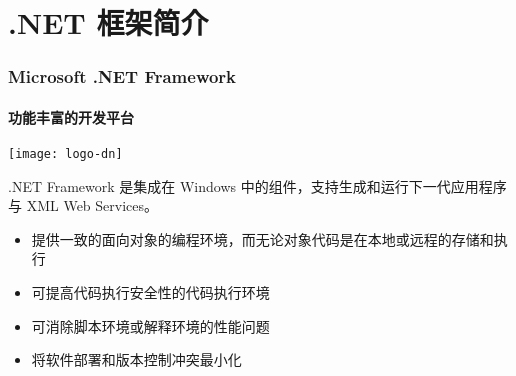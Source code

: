 \section{.NET 框架简介}

\begin{frame}
\frametitle{Microsoft .NET Framework}
\framesubtitle{功能丰富的开发平台}

\centering \texttt{[image: logo-dn]}

.NET Framework 是集成在 Windows 中的组件，支持生成和运行下一代应用程序与 XML Web Services。

\begin{itemize}
\item 提供一致的面向对象的编程环境，而无论对象代码是在本地或远程的存储和执行
\item 可提高代码执行安全性的代码执行环境
\item 可消除脚本环境或解释环境的性能问题
\item 将软件部署和版本控制冲突最小化
\end{itemize}
\end{frame}

